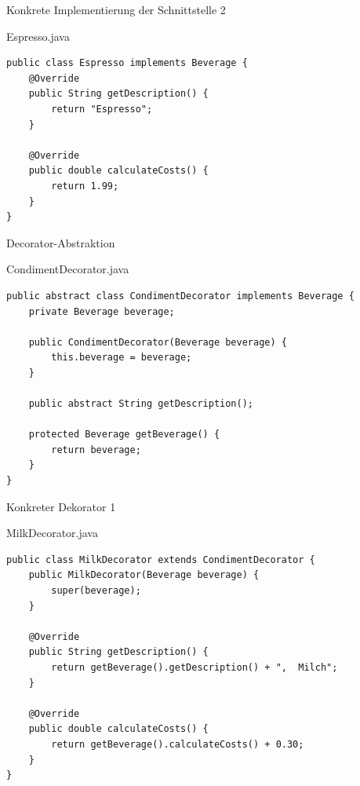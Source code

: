 \begin{frame}[fragile]{Konkrete Implementierung der Schnittstelle 2}
	\begin{exampleblock}{Espresso.java}
        \begin{lstlisting}
public class Espresso implements Beverage {
    @Override
    public String getDescription() {
        return "Espresso";
    }

    @Override
    public double calculateCosts() {
        return 1.99;
    }
}
        \end{lstlisting}
	\end{exampleblock}
\end{frame}

\begin{frame}[fragile]{Decorator-Abstraktion}
	\begin{exampleblock}{CondimentDecorator.java}
        \begin{lstlisting}
public abstract class CondimentDecorator implements Beverage {
    private Beverage beverage;

    public CondimentDecorator(Beverage beverage) {
        this.beverage = beverage;
    }

    public abstract String getDescription();
    
    protected Beverage getBeverage() {
		return beverage;
	}
}
        \end{lstlisting}
	\end{exampleblock}
\end{frame}

\begin{frame}[fragile]{Konkreter Dekorator 1}
	\begin{exampleblock}{MilkDecorator.java}
        \begin{lstlisting}
public class MilkDecorator extends CondimentDecorator {
    public MilkDecorator(Beverage beverage) {
        super(beverage);
    }

    @Override
    public String getDescription() {
        return getBeverage().getDescription() + ",  Milch";
    }

    @Override
    public double calculateCosts() {
        return getBeverage().calculateCosts() + 0.30;
    }
}
        \end{lstlisting}
	\end{exampleblock}
\end{frame}

